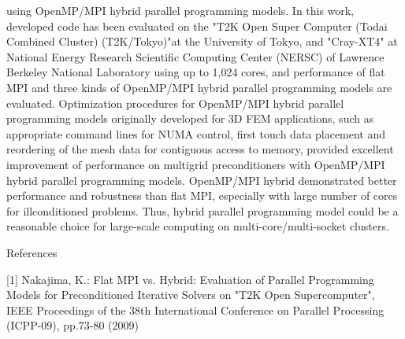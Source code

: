 \documentclass{report}
\begin{document}
using OpenMP/MPI hybrid parallel programming models. In this work,
developed code has been evaluated on the "T2K Open Super Computer (Todai
Combined Cluster) (T2K/Tokyo)"at the University of Tokyo, and "Cray-XT4"
at National Energy Research Scientific Computing Center (NERSC) of
Lawrence Berkeley National Laboratory using up to 1,024 cores, and
performance of flat MPI and three kinds of OpenMP/MPI hybrid parallel
programming models are evaluated. Optimization procedures for OpenMP/MPI
hybrid parallel programming models originally developed for 3D FEM
applications, such as appropriate command lines for NUMA control, first
touch data placement and reordering of the mesh data for contiguous
access to memory, provided excellent improvement of performance on
multigrid preconditioners with OpenMP/MPI hybrid parallel programming
models. OpenMP/MPI hybrid demonstrated better performance and robustness
than flat MPI, especially with large number of cores for illconditioned
problems. Thus, hybrid parallel programming model could be a reasonable
choice for large-scale computing on multi-core/multi-socket clusters.


References

[1] Nakajima, K.: Flat MPI vs. Hybrid: Evaluation of Parallel Programming
Models for Preconditioned Iterative Solvers on "T2K Open Supercomputer",
IEEE Proceedings of the 38th International Conference on Parallel
Processing (ICPP-09), pp.73-80 (2009)
\end{document}
